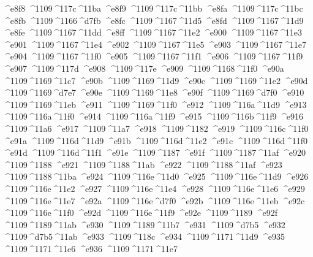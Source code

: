 \checkit ^^^^e8f8 ^^^^1109^^^^117c^^^^11ba
\checkit ^^^^e8f9 ^^^^1109^^^^117c^^^^11bb
\checkit ^^^^e8fa ^^^^1109^^^^117c^^^^11bc
\checkit ^^^^e8fb ^^^^1109^^^^1166^^^^d7fb
\checkit ^^^^e8fc ^^^^1109^^^^1167^^^^11d5
\checkit ^^^^e8fd ^^^^1109^^^^1167^^^^11d9
\checkit ^^^^e8fe ^^^^1109^^^^1167^^^^11dd
\checkit ^^^^e8ff ^^^^1109^^^^1167^^^^11e2
\checkit ^^^^e900 ^^^^1109^^^^1167^^^^11e3
\checkit ^^^^e901 ^^^^1109^^^^1167^^^^11e4
\checkit ^^^^e902 ^^^^1109^^^^1167^^^^11e5
\checkit ^^^^e903 ^^^^1109^^^^1167^^^^11e7
\checkit ^^^^e904 ^^^^1109^^^^1167^^^^11f0
\checkit ^^^^e905 ^^^^1109^^^^1167^^^^11f1
\checkit ^^^^e906 ^^^^1109^^^^1167^^^^11f9
\checkit ^^^^e907 ^^^^1109^^^^117d
\checkit ^^^^e908 ^^^^1109^^^^117e
\checkit ^^^^e909 ^^^^1109^^^^1168^^^^11f0
\checkit ^^^^e90a ^^^^1109^^^^1169^^^^11c7
\checkit ^^^^e90b ^^^^1109^^^^1169^^^^11d9
\checkit ^^^^e90c ^^^^1109^^^^1169^^^^11e2
\checkit ^^^^e90d ^^^^1109^^^^1169^^^^d7e7
\checkit ^^^^e90e ^^^^1109^^^^1169^^^^11e8
\checkit ^^^^e90f ^^^^1109^^^^1169^^^^d7f0
\checkit ^^^^e910 ^^^^1109^^^^1169^^^^11eb
\checkit ^^^^e911 ^^^^1109^^^^1169^^^^11f0
\checkit ^^^^e912 ^^^^1109^^^^116a^^^^11d9
\checkit ^^^^e913 ^^^^1109^^^^116a^^^^11f0
\checkit ^^^^e914 ^^^^1109^^^^116a^^^^11f9
\checkit ^^^^e915 ^^^^1109^^^^116b^^^^11f9
\checkit ^^^^e916 ^^^^1109^^^^11a6
\checkit ^^^^e917 ^^^^1109^^^^11a7
\checkit ^^^^e918 ^^^^1109^^^^1182
\checkit ^^^^e919 ^^^^1109^^^^116c^^^^11f0
\checkit ^^^^e91a ^^^^1109^^^^116d^^^^11d9
\checkit ^^^^e91b ^^^^1109^^^^116d^^^^11e2
\checkit ^^^^e91c ^^^^1109^^^^116d^^^^11f0
\checkit ^^^^e91d ^^^^1109^^^^116d^^^^11f1
\checkit ^^^^e91e ^^^^1109^^^^1187
\checkit ^^^^e91f ^^^^1109^^^^1187^^^^11af
\checkit ^^^^e920 ^^^^1109^^^^1188
\checkit ^^^^e921 ^^^^1109^^^^1188^^^^11ab
\checkit ^^^^e922 ^^^^1109^^^^1188^^^^11af
\checkit ^^^^e923 ^^^^1109^^^^1188^^^^11ba
\checkit ^^^^e924 ^^^^1109^^^^116e^^^^11d0
\checkit ^^^^e925 ^^^^1109^^^^116e^^^^11d9
\checkit ^^^^e926 ^^^^1109^^^^116e^^^^11e2
\checkit ^^^^e927 ^^^^1109^^^^116e^^^^11e4
\checkit ^^^^e928 ^^^^1109^^^^116e^^^^11e6
\checkit ^^^^e929 ^^^^1109^^^^116e^^^^11e7
\checkit ^^^^e92a ^^^^1109^^^^116e^^^^d7f0
\checkit ^^^^e92b ^^^^1109^^^^116e^^^^11eb
\checkit ^^^^e92c ^^^^1109^^^^116e^^^^11f0
\checkit ^^^^e92d ^^^^1109^^^^116e^^^^11f9
\checkit ^^^^e92e ^^^^1109^^^^1189
\checkit ^^^^e92f ^^^^1109^^^^1189^^^^11ab
\checkit ^^^^e930 ^^^^1109^^^^1189^^^^11b7
\checkit ^^^^e931 ^^^^1109^^^^d7b5
\checkit ^^^^e932 ^^^^1109^^^^d7b5^^^^11ab
\checkit ^^^^e933 ^^^^1109^^^^118c
\checkit ^^^^e934 ^^^^1109^^^^1171^^^^11d9
\checkit ^^^^e935 ^^^^1109^^^^1171^^^^11e6
\checkit ^^^^e936 ^^^^1109^^^^1171^^^^11e7
